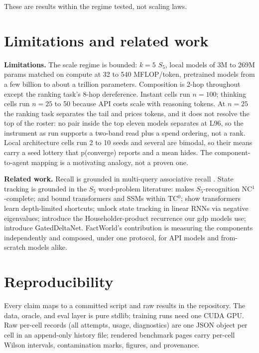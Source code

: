 \documentclass[11pt]{article}
\newcommand{\Sfive}{$S_5$}
\begin{document}
These are results within the regime tested, not scaling laws.

\section{Limitations and related work}

\textbf{Limitations.} The scale regime is bounded: $k=5$ \Sfive, local models of 3M to 269M
params matched on compute at 32 to 540 MFLOP/token, pretrained models from a few billion to
about a trillion parameters. Composition is 2-hop throughout except the ranking task's 8-hop dereference. Instant cells run $n=100$; thinking cells run $n=25$ to 50 because API costs scale with reasoning tokens. At $n=25$ the ranking task separates the tail and prices tokens, and it does not resolve the top of the roster: no pair inside the top eleven models separates at L96, so the instrument as run supports a two-band read plus a spend ordering, not a rank. Local architecture cells run 2 to 10 seeds and several are bimodal, so their means carry a seed lottery that p(converge) reports and a mean hides. The
component-to-agent mapping is a motivating analogy, not a proven one.

\textbf{Related work.} Recall is grounded in multi-query associative recall
\citep{arora2023zoology}. State tracking is grounded in the \Sfive{} word-problem literature:
\citet{barrington1989} makes \Sfive-recognition NC$^1$-complete; \citet{merrill2023} and
\citet{merrill2024illusion} bound transformers and SSMs within TC$^0$; \citet{liu2023}
show transformers learn depth-limited shortcuts; \citet{grazzi2024} unlock state tracking in
linear RNNs via negative eigenvalues; \citet{siems2025deltaproduct} introduce the
Householder-product recurrence our gdp models use; \citet{yang2024gated} introduce
GatedDeltaNet. FactWorld's contribution is measuring the components independently and
composed, under one protocol, for API models and from-scratch models alike.

\section{Reproducibility}

Every claim maps to a committed script and raw results in the repository. The data, oracle, and eval layer is pure stdlib; training runs need one CUDA GPU. Raw per-cell records (all attempts, usage, diagnostics) are one JSON object per cell in an append-only history file; rendered benchmark pages carry per-cell Wilson intervals, contamination marks, figures, and provenance.
\end{document}
